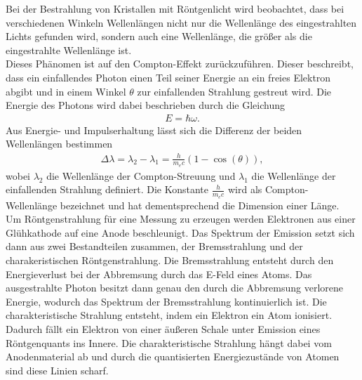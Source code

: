 Bei der Bestrahlung von Kristallen mit Röntgenlicht wird beobachtet, dass
bei verschiedenen Winkeln Wellenlängen nicht nur die Wellenlänge des eingestrahlten Lichts gefunden wird,
sondern auch eine Wellenlänge, die größer als die eingestrahlte Wellenlänge ist.\\
Dieses Phänomen ist auf den Compton-Effekt zurückzuführen. Dieser beschreibt,
dass ein einfallendes Photon einen Teil seiner Energie an ein freies Elektron abgibt
und in einem Winkel $\theta $ zur einfallenden Strahlung gestreut wird. Die Energie des Photons wird 
dabei beschrieben durch die Gleichung 
\begin{align}
    E  = \hbar \omega \label{eq:1}.
\end{align}
Aus Energie- und Impulserhaltung lässt sich die Differenz der beiden Wellenlängen bestimmen \cite{V603}
\begin{align}
    \Delta \lambda = \lambda _2 - \lambda _1 = \frac{h}{m_e c}(1-\cos(\theta))  \label{eq:2},
\end{align}
wobei $\lambda _2 $ die Wellenlänge der Compton-Streuung und $\lambda _1 $ die Wellenlänge
der einfallenden Strahlung definiert. Die Konstante $\frac{h}{m_e c}$ wird als
Compton-Wellenlänge bezeichnet und hat dementsprechend die Dimension einer Länge.\\
Um Röntgenstrahlung für eine Messung zu erzeugen werden Elektronen aus einer 
Glühkathode  auf eine Anode beschleunigt. Das Spektrum der Emission
setzt sich dann aus zwei Bestandteilen zusammen, der Bremsstrahlung und
der charakeristischen Röntgenstrahlung.
Die Bremsstrahlung entsteht durch den Energieverlust bei der Abbremsung durch
das E-Feld eines Atoms. Das ausgestrahlte Photon besitzt dann genau den
durch die Abbremsung verlorene Energie, wodurch das Spektrum der Bremsstrahlung kontinuierlich
ist. 
Die charakteristische Strahlung entsteht, indem ein Elektron ein Atom ionisiert.
Dadurch fällt ein Elektron von einer äußeren Schale unter Emission eines 
Röntgenquants ins Innere. Die charakteristische Strahlung hängt
dabei vom Anodenmaterial ab und durch die quantisierten Energiezustände von Atomen
sind diese Linien scharf.\\
